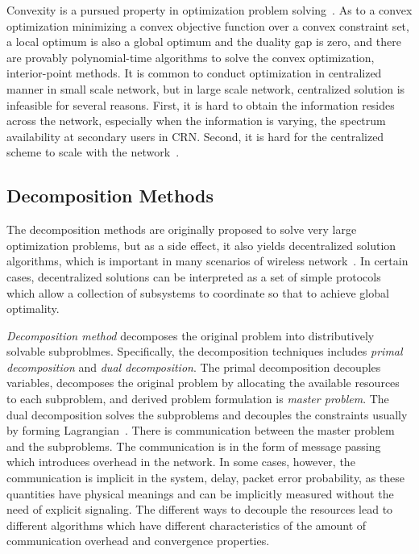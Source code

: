 Convexity is a pursued property in optimization problem solving~\cite{Boyd:2004:CO:993483}.
As to a convex optimization \ie minimizing a convex objective function over a convex constraint set, a local optimum is also a global optimum and the duality gap is zero, and there are provably polynomial-time algorithms to solve the convex optimization, \ie interior-point methods. 
It is common to conduct optimization in centralized manner in small scale network, but in large scale network, centralized solution is infeasible for several reasons.
First, it is hard to obtain the information resides across the network, especially when the information is varying, \ie the spectrum availability at secondary users in CRN.
Second, it is hard for the centralized scheme to scale with the network~\cite{Palomar06atutorial}.

\subsection{Decomposition Methods}
The decomposition methods are originally proposed to solve very large optimization problems, but as a side effect, it also yields decentralized solution algorithms, which is important in many scenarios of wireless network~\cite{boyd2007notes}. 
In certain cases, decentralized solutions can be interpreted as a set of simple protocols which allow a collection of subsystems to coordinate so that to achieve global optimality.

\textit{Decomposition method} decomposes the original problem into distributively solvable subproblmes.
Specifically, the decomposition techniques includes \textit{primal decomposition} and \textit{dual decomposition}.
The primal decomposition decouples variables, \ie decomposes the original problem by allocating the available resources to each subproblem, and derived problem formulation is \textit{master problem}.
The dual decomposition solves the subproblems and decouples the constraints usually by forming Lagrangian~\cite{Bertsekas_99, Palomar06atutorial}.
There is communication between the master problem and the subproblems.
The communication is in the form of message passing which introduces overhead in the network.
In some cases, however, the communication is implicit in the system, \eg delay, packet error probability, as these quantities have physical meanings and can be implicitly measured without the need of explicit signaling.
The different ways to decouple the resources lead to different algorithms which have different characteristics of the amount of communication overhead and convergence properties.

